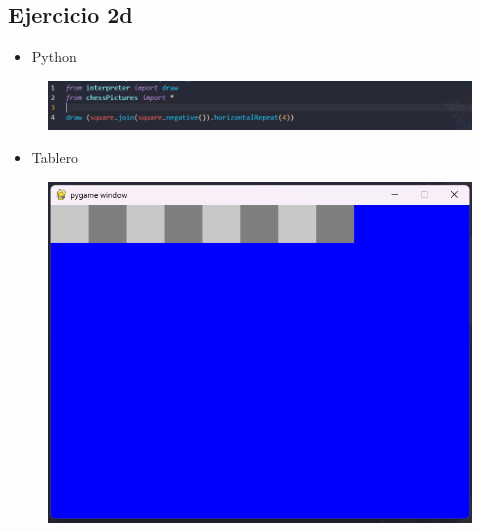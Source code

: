 \documentclass{article}
\begin{document}
	\subsection{Ejercicio 2d}
	\begin{itemize}
		\item Python
	\end{itemize}
	\begin{figure}[H]
		\centering
		\includegraphics[width=1.0\textwidth, keepaspectratio]{img/ejercicio2d}
	\end{figure}
	\begin{itemize}
		\item Tablero
	\end{itemize}
	\begin{figure}[H]
		\centering
		\includegraphics[width=1.0\textwidth, keepaspectratio]{img/ejercicio2dd}
	\end{figure}
	
\end{document}
